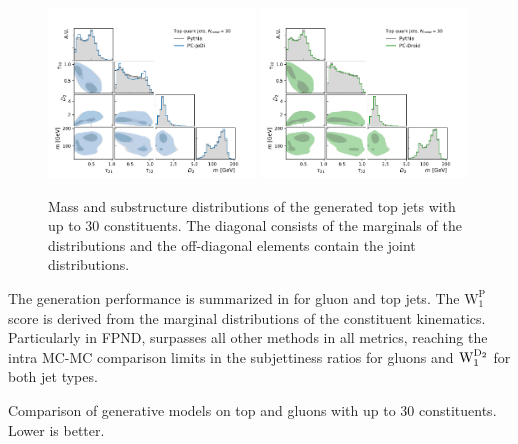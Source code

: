 \begin{figure}[htpb]
    \centering
    \includegraphics[width=0.49\textwidth]{Figures/jet_generation/droid/30/hlvs/t/100/hlv_corr_PC-Jedi.pdf}
    \includegraphics[width=0.49\textwidth]{Figures/jet_generation/droid/30/hlvs/t/100/hlv_corr_PC-Droid.pdf}
    \caption{
        Mass and substructure distributions of the generated top jets with up to 30 constituents.
        The diagonal consists of the marginals of the distributions and the off-diagonal elements contain the joint distributions.
    }
    \label{fig:hlvs-30}
\end{figure}

The generation performance is summarized in  for gluon and top jets.
The $\mathrm{W_1^P}$ score is derived from the marginal distributions of the constituent kinematics.
Particularly in FPND, \pcdroid surpasses all other methods in all metrics, reaching the intra MC-MC comparison limits in the subjettiness ratios for gluons and $\mathrm{W_1^{\text{D}_2}}$ for both jet types.

\begin{table}[tp]
    \centering
    \caption{Comparison of generative models on top and gluons with up to 30 constituents. Lower is better.}
    \label{tab:30_table}
    \renewcommand{\arraystretch}{1.5}
    \resizebox{\textwidth}{!}{%
        
    }
\end{table}

